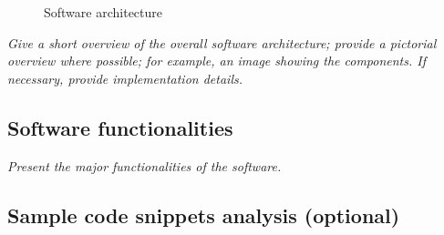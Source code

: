 \begin{figure}

\caption{Software architecture}
\label{Fig:softwareArchitecture}
\end{figure}



\textit{  Give a short overview of the overall software architecture; provide a pictorial overview where possible; for example, an image showing the components. If necessary, provide implementation details.}

 \subsection{Software functionalities}
\textit{  Present the major functionalities of the software.}

 \subsection{Sample code snippets analysis (optional)}
